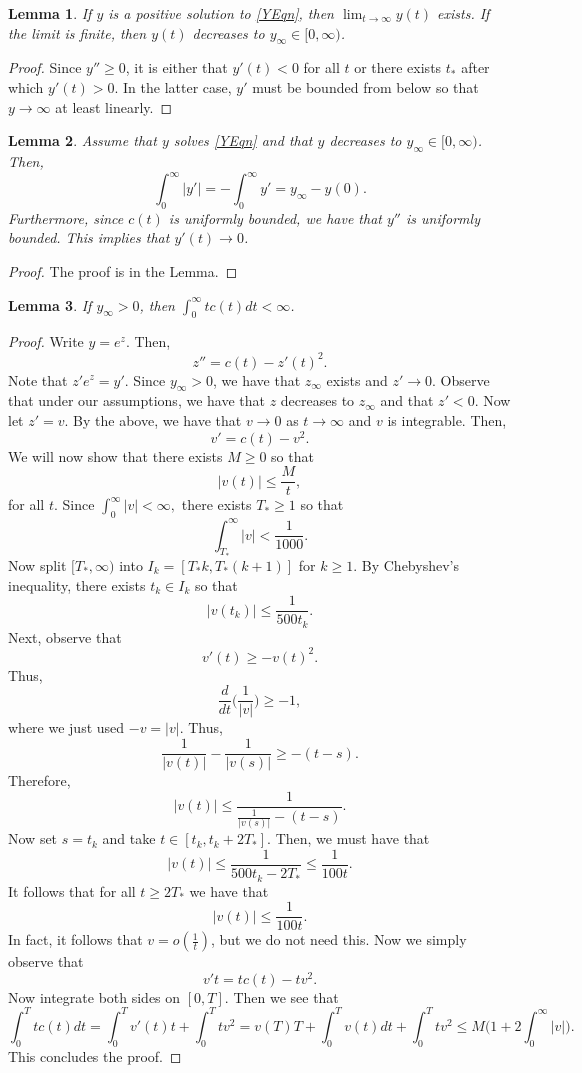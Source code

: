 \documentclass[10pt]{article}
\numberwithin{equation}{section}
\theoremstyle{plain}
\newtheorem{lemma}{Lemma}[section]
\theoremstyle{definition}
\numberwithin{equation}{section}
\begin{document}
\begin{lemma}\label{ODELemma1}
If $y$ is a positive solution to \eqref{YEqn}, then $\lim_{t\rightarrow\infty} y(t)$ exists. If the limit is finite, then $y(t)$ decreases to $y_\infty\in [0,\infty)$. 
\end{lemma}
\begin{proof}
Since $y''\geq 0$, it is either that $y'(t)<0$ for all $t$ or there exists $t_*$ after which $y'(t)>0$. In the latter case, $y'$ must be bounded from below so that $y\rightarrow \infty$ at least linearly.
\end{proof}

\begin{lemma}\label{ODELemma2}
Assume that $y$ solves \eqref{YEqn} and that $y$ decreases to $y_\infty\in [0,\infty)$. Then, 
\[\int_0^\infty |y'|=-\int_0^\infty y'=y_\infty-y(0).\] Furthermore, since $c(t)$ is uniformly bounded, we have that $y''$ is uniformly bounded. This implies that $y'(t)\rightarrow 0$. 
\end{lemma}

\begin{proof}
The proof is in the Lemma.
\end{proof}

\begin{lemma}\label{ODELemma3}
If $y_\infty>0$, then $\int_0^\infty t c(t) dt <\infty$. 
\end{lemma}

\begin{proof}

Write $y=e^z$. Then, 
\[z''=c(t)-z'(t)^2.\] Note that $z'e^z=y'$. Since $y_\infty>0$, we have that $z_\infty$ exists and $z'\rightarrow 0$. 
Observe that under our assumptions, we have that $z$ decreases to $z_\infty$ and that $z'<0$. Now let $z'=v$.  By the above, we have that $v\rightarrow 0$ as $t\rightarrow\infty$ and $v$ is integrable.  Then, \[v'=c(t)-v^2.\]
We will now show that there exists $M\geq 0$ so that \[|v(t)|\leq \frac{M}{t},\] for all $t$. Since $\int_0^\infty |v|<\infty,$ there exists $T_*\geq 1$ so that 
\[\int_{T_*}^\infty|v|<\frac{1}{1000}.\]
Now split $[T_*,\infty)$ into $I_k=[T_*k, T_*(k+1)]$ for $k\geq 1$. 
By Chebyshev's inequality, there exists $t_k\in I_k$ so that \[|v(t_k)|\leq \frac{1}{500t_k}.\] Next, observe that \[v'(t)\geq -v(t)^2.\] Thus, 
\[\frac{d}{dt}\Big(\frac{1}{|v|}\Big)\geq -1,\] where we just used $-v=|v|$. Thus, 
\[\frac{1}{|v(t)|}-\frac{1}{|v(s)|}\geq -(t-s).\] Therefore, 
\[|v(t)|\leq \frac{1}{\frac{1}{|v(s)|}-(t-s)}.\] Now set $s=t_k$ and take $t\in [t_k, t_k+2T_*].$ Then, we must have that
\[|v(t)|\leq \frac{1}{500t_k-2T_*}\leq \frac{1}{100t}.\] It follows that for all $t\geq 2T_*$ we have that \[|v(t)|\leq\frac{1}{100t}.\] In fact, it follows that $v=o(\frac{1}{t})$, but we do not need this. Now we simply observe that 
\[v't=tc(t)-tv^2.\] Now integrate both sides on $[0,T]$. 
Then we see that 
\[ \int_0^T tc(t)dt=\int_0^T v'(t)t +\int_0^T tv^2= v(T)T+\int_0^T v(t)dt +\int_0^Ttv^2\leq M\Big(1+2\int_0^\infty |v|\Big).\] This concludes the proof. 
\end{proof}
\end{document}
